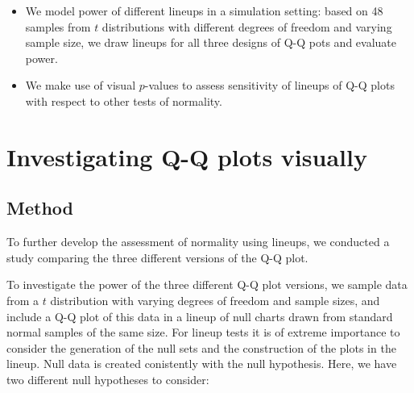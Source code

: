 \documentclass{article}\usepackage[]{graphicx}\usepackage[]{color}
\newcommand{\hh}[1]{{\color{magenta} #1}}
\newcommand{\al}[1]{{\color{red} #1}}
\newcommand{\hhnote}[1]{\todo[inline,color=magenta!40]{#1}}
\begin{document}
\hhnote{Outline of the paper:}
\hh{
\begin{itemize}
\item We model power of different lineups in a simulation setting: based on 48 samples from $t$ distributions with different degrees of freedom and varying sample size, we draw lineups for all three designs of Q-Q pots and evaluate power.
\item We make use of visual $p$-values to assess sensitivity of lineups of Q-Q plots with respect to other tests of normality.
\end{itemize}}


\section{Investigating Q-Q plots visually}\label{sec:qqplot}

\subsection{Method}

To further \al{develop} the assessment of normality using lineups, we conducted a study comparing the three different versions of the Q-Q plot.


To investigate the power of the three different Q-Q plot versions, we sample data from a $t$ distribution with varying degrees of freedom and sample sizes, and include a Q-Q plot of this data in a lineup of null charts drawn from standard normal samples of the same size.
For lineup tests it is of extreme importance to consider the generation of the null sets and the construction of the plots in the lineup. 
Null data is created conistently with the null hypothesis. Here, we have two different null hypotheses to consider:
\end{document}

